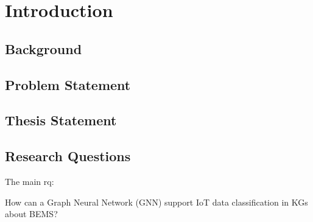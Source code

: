 \chapter{Introduction}\label{chap:intro}

\section{Background}\label{sec:background}

\section{Problem Statement}\label{sec:problem-statement}

\section{Thesis Statement}\label{sec:thesis-statement}

\section{Research Questions}\label{sec:research-questions}
The main \gls{rq}:

How can a Graph Neural Network (GNN) support IoT data classification in KGs about BEMS?